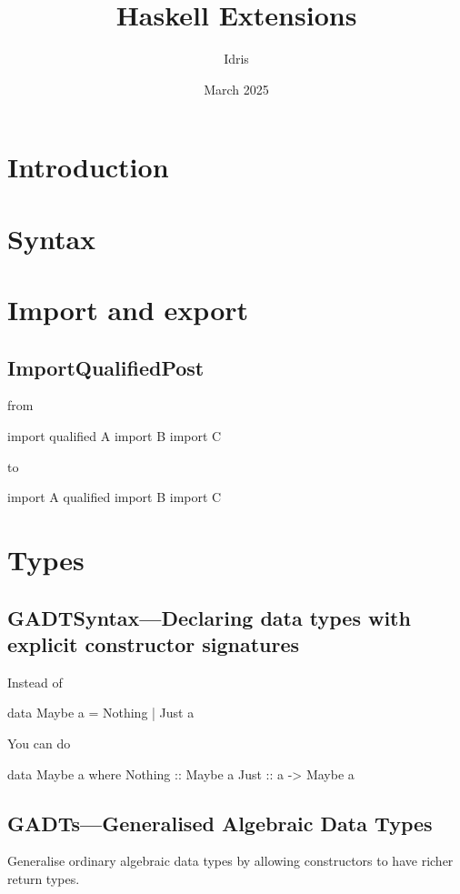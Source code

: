 \documentclass[openany, 12pt]{book}
\title{Haskell Extensions}
\author{Idris}
\date{March 2025}
\begin{document}
\tableofcontents

\part{Introduction}
\part{Syntax}
\part{Import and export}

\chapter{ImportQualifiedPost}
from
\begin{haskell}{}
import qualified A
import           B
import           C
\end{haskell}

to
\begin{haskell}{}
import A qualified
import B
import C
\end{haskell}


\part{Types}


\setcounter{chapter}{7}
\chapter{GADTSyntax---Declaring data types with explicit constructor signatures}
Instead of
\begin{haskell}{}
data Maybe a = Nothing | Just a
\end{haskell}

You can do
\begin{haskell}{}
data Maybe a where
    Nothing :: Maybe a
    Just    :: a -> Maybe a
\end{haskell}

\chapter{GADTs---Generalised Algebraic Data Types}
Generalise ordinary algebraic data types by allowing constructors to have richer
return types.
\end{document}
